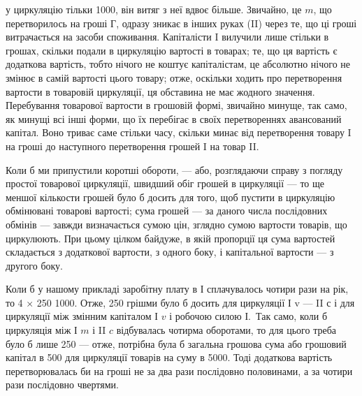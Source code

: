 \parcont{}  %
у циркуляцію тільки 1000, він витяг з неї вдвоє більше. Звичайно,
це $m$, що перетворилось на гроші $Г$, одразу зникає в інших руках
(II) через те, що ці гроші витрачається на засоби споживання. Капіталісти I
вилучили лише стільки в грошах, скільки подали в циркуляцію вартості
в товарах; те, що ця вартість є додаткова вартість, тобто нічого не коштує
капіталістам, це абсолютно нічого не змінює в самій вартості цього товару;
отже, оскільки ходить про перетворення вартости в товаровій циркуляції,
ця обставина не має жодного значення. Перебування товарової вартости
в грошовій формі, звичайно минуще, так само, як минущі всі інші форми,
що їх перебігає в своїх перетвореннях авансований капітал. Воно триває
саме стільки часу, скільки минає від перетворення товару I на гроші до
наступного перетворення грошей I на товар II.

Коли б ми припустили коротші обороти, — або, розглядаючи справу
з погляду простої товарової циркуляції, швидший обіг грошей в циркуляції
— то ще меншої кількости грошей було б досить для того, щоб
пустити в циркуляцію обмінювані товарові вартості; сума грошей — за
даного числа послідовних обмінів — завжди визначається сумою цін, зглядно
сумою вартости товарів, що циркулюють. При цьому цілком байдуже,
в якій пропорції ця сума вартостей складається з додаткової вартости,
з одного боку, і капітальної вартости — з другого боку.

Коли б у нашому прикладі заробітну плату в І сплачувалось чотири
рази на рік, то 4 × 250 \deq{} 1000. Отже, 250 грішми було б
досить для циркуляції І v —  II $с$ і для циркуляції між змінним капіталом
І $v$ і робочою силою І.~Так само, коли б циркуляція між І $m$ і
II $c$ відбувалась чотирма оборотами, то для цього треба було б лише
250 — отже, потрібна була б загальна грошова сума або грошовий
капітал в 500 для циркуляції товарів на суму в 5000.
Тоді додаткова вартість перетворювалась би на гроші не за два рази
послідовно половинами, а за чотири рази послідовно чвертями.

